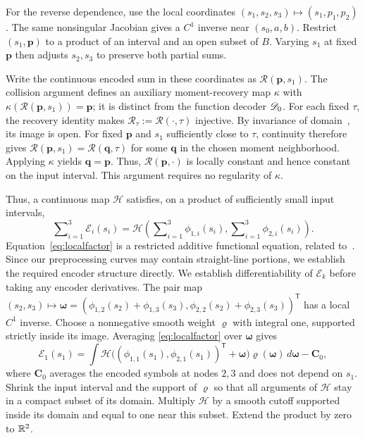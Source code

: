 \documentclass[journal,12pt,onecolumn,draftclsnofoot]{IEEEtran}
\newcommand{\T}{\mathsf T}\newcommand{\suc}{\succeq}
\begin{document}
For the reverse dependence, use the local coordinates
$(s_1,s_2,s_3)\mapsto(s_1,p_1,p_2)$.
The same nonsingular Jacobian gives a $C^1$ inverse near
$(s_0,a,b)$. Restrict $(s_1,\boldsymbol p)$ to a product of an
interval and an open subset of $B$. Varying $s_1$ at fixed
$\boldsymbol p$ then adjusts $s_2,s_3$ to preserve both partial sums.


Write the continuous encoded sum in these coordinates as
$\mathscr R(\boldsymbol p,s_1)$. The collision argument defines an auxiliary moment-recovery map $\kappa$ with
$\kappa(\mathscr R(\boldsymbol p,s_1))=\boldsymbol p$; it is distinct from the function decoder $\mathscr{D}_0$. For each fixed $\tau$, the recovery identity makes
$\mathscr R_\tau:=\mathscr R(\cdot,\tau)$ injective.
By invariance of domain~\cite[Theorem~2B.3]{hatcher},
its image is open. For fixed $\boldsymbol p$ and
$s_1$ sufficiently close to $\tau$, continuity therefore gives
$\mathscr R(\boldsymbol p,s_1)=\mathscr R(\boldsymbol q,\tau)$
for some $\boldsymbol q$ in the chosen moment neighborhood.
Applying $\kappa$ yields $\boldsymbol q=\boldsymbol p$.
Thus, $\mathscr R(\boldsymbol p,\cdot)$ is locally constant
and hence constant on the input interval.
This argument requires no regularity of $\kappa$. 

Thus, a continuous map $\mathscr H$ satisfies,
on a product of sufficiently small input intervals,
\begin{equation}
 \sum\nolimits_{i=1}^3\mathscr E_i(s_i)
 =\mathscr H\!\left(\sum\nolimits_{i=1}^3\phi_{1,i}(s_i),
                         \sum\nolimits_{i=1}^3\phi_{2,i}(s_i)\right).
 \label{eq:localfactor}
\end{equation}
Equation~\eqref{eq:localfactor} is a restricted additive functional equation, related to~\cite[Theorem~1.6]{charalambides2013}. Since our preprocessing curves may contain straight-line portions, we establish the required encoder structure directly.
We establish differentiability of $\mathscr E_k$ before taking any encoder
derivatives. The pair map
$(s_2,s_3)\mapsto\boldsymbol\omega=
(\phi_{1,2}(s_2)+\phi_{1,3}(s_3),
 \phi_{2,2}(s_2)+\phi_{2,3}(s_3))^\T$
has a local $C^1$ inverse. Choose a nonnegative smooth weight $\varrho$ with integral one, supported strictly inside its image. Averaging \eqref{eq:localfactor} over $\boldsymbol\omega$ gives
$$
 \mathscr E_1(s_1)=\int
 \mathscr H\bigl((\phi_{1,1}(s_1),\phi_{2,1}(s_1))^\T+\boldsymbol\omega\bigr)
 \varrho(\boldsymbol\omega)\,d\boldsymbol\omega-\boldsymbol C_0,
$$
where $\boldsymbol C_0$ averages the encoded symbols at nodes $2,3$ and
does not depend on $s_1$. Shrink the input interval and the support of
$\varrho$ so that all arguments of $\mathscr H$ stay in a compact subset
of its domain. Multiply $\mathscr H$ by a smooth cutoff supported inside its domain
and equal to one near this subset. Extend the product by zero to $\mathbb R^2$.
\end{document}
